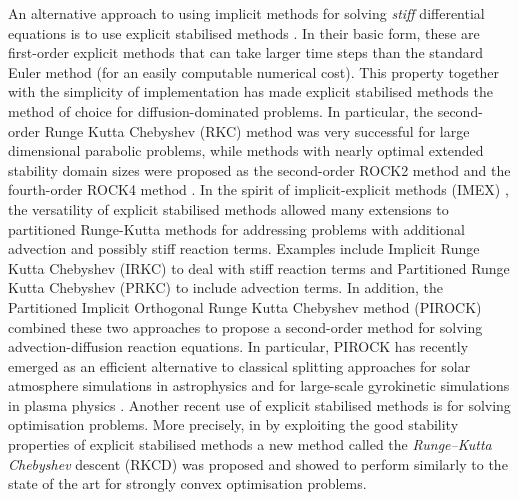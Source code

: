 \documentclass[10pt,a4paper]{article}
\begin{document}
An alternative approach to using implicit methods for solving \emph{stiff} differential equations is to use explicit stabilised methods \cite{Abdrev}. In their basic form, these are first-order explicit methods that can take larger time steps than the standard Euler method (for an easily computable numerical cost). This property together with the simplicity of implementation has made explicit stabilised methods the method of choice for diffusion-dominated problems. In particular, the second-order Runge Kutta Chebyshev (RKC) method was very successful for large dimensional parabolic problems, while methods with nearly optimal extended stability domain sizes were proposed as the second-order ROCK2 method \cite{AbM01} and the fourth-order ROCK4 method \cite{Abd02}. In the spirit of implicit-explicit methods {(IMEX) \cite{ARW95,ARW97}}, the versatility of explicit stabilised methods allowed many extensions to partitioned Runge-Kutta methods for addressing problems with additional advection and possibly stiff reaction terms. Examples include {Implicit Runge Kutta Chebyshev (IRKC)  \cite{SSV06}} to deal with stiff reaction terms and Partitioned Runge Kutta Chebyshev (PRKC) \cite{Zb11} to include advection terms. In addition, the Partitioned Implicit Orthogonal Runge Kutta Chebyshev method  (PIROCK) \cite{AV13} combined these two approaches to propose a second-order method for solving advection-diffusion reaction equations.  
In particular, PIROCK has recently emerged as an efficient alternative to classical splitting approaches for solar atmosphere simulations in astrophysics \cite{WVMP24} and for large-scale gyrokinetic simulations in plasma physics \cite{AUB26,AOUB26}.
Another recent use of explicit stabilised methods is for solving optimisation problems. More precisely, in  \cite{EVVZ21} by exploiting the good stability properties of explicit stabilised methods a new method called the \emph{Runge–Kutta Chebyshev} descent (RKCD) was proposed and showed to perform similarly to the state of the art for strongly convex optimisation problems.
\end{document}
